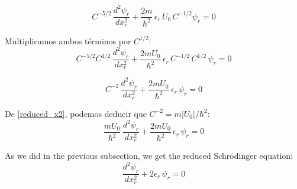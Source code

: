 \[
C^{-5/2}\,\frac{d^2\psi_r}{dx_r^2}
	 + \frac{2m}{\hbar^2}\,\epsilon_r\,U_0\,C^{-1/2}\psi_r=0
\]

Multiplicamos ambos términos por $C^{1/2}$:
\[
C^{-5/2}C^{1/2}\,\frac{d^2\psi_r}{dx_r^2}
	 + \frac{2mU_0}{\hbar^2}\,\epsilon_r\,C^{-1/2}\,C^{1/2}\,\psi_r=0
\]

\[
C^{-2}\,\frac{d^2\psi_r}{dx_r^2}
	 + \frac{2mU_0}{\hbar^2}\,\epsilon_r\,\psi_r=0
\]

De \ref{reduced_x2}, podemos deducir que $C^{-2}=m|U_0|/\hbar^2$:
\[
\frac{mU_0}{\hbar^2}\,\frac{d^2\psi_r}{dx_r^2}
	 + \frac{2mU_0}{\hbar^2}\,\epsilon_r\,\psi_r=0
\]

As we did in the previous subsection, we get the reduced Schrödinger equation:
\begin{equation}
\frac{d^2\psi_r}{dx_r^2} + 2\epsilon_r\,\psi_r=0
\end{equation}

